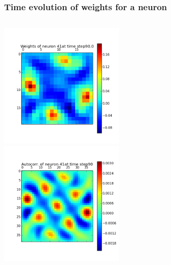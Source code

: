 \begin{frame}
\frametitle{Time evolution of weights for a neuron}
\begin{columns}[t]
\centering
\includegraphics[width=6cm,height=6cm]{neurons/neuron_w_41_t_90.png}\\
\centering
\includegraphics[width=6cm,height=6cm]{neurons/neuron_a_41_t_90.png}\\
\end{columns}
\end{frame}

